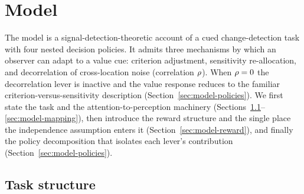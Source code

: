 
\section{Model}
\label{sec:model}

The model is a signal-detection-theoretic account of a cued
change-detection task with four nested decision policies. It admits
three mechanisms by which an observer can adapt to a value cue:
criterion adjustment, sensitivity re-allocation, and decorrelation of
cross-location noise (correlation $\rho$). When $\rho = 0$ the
decorrelation lever is inactive and the value response reduces to the
familiar criterion-versus-sensitivity description
(Section~\ref{sec:model-policies}). We first state the task and the
attention-to-perception machinery (Sections~\ref{sec:model-task}--%
\ref{sec:model-mapping}), then introduce the reward structure and the
single place the independence assumption enters it
(Section~\ref{sec:model-reward}), and finally the policy decomposition
that isolates each lever's contribution
(Section~\ref{sec:model-policies}).

\subsection{Task structure}
\label{sec:model-task}

